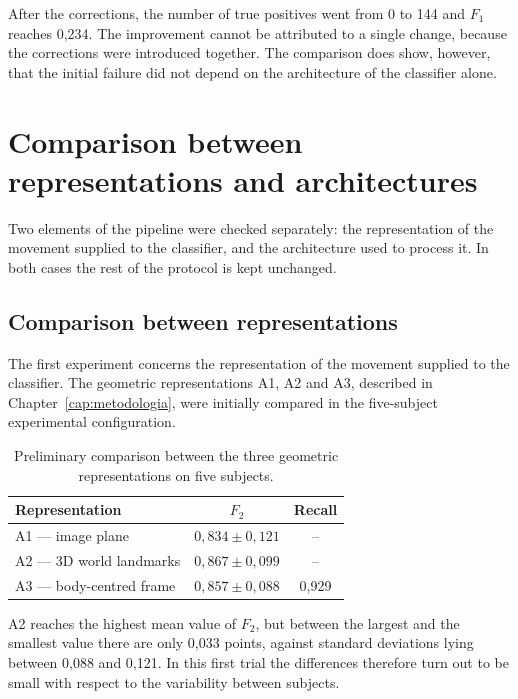 After the corrections, the number of true positives went from 0 to 144 and $F_1$ reaches 0,234. The improvement cannot be attributed to a single change, because the corrections were introduced together. The comparison does show, however, that the initial failure did not depend on the architecture of the classifier alone.

\section{Comparison between representations and architectures}
\label{sec:grandezze}

Two elements of the pipeline were checked separately: the representation of the movement supplied to the classifier, and the architecture used to process it. In both cases the rest of the protocol is kept unchanged.

\subsection{Comparison between representations}
\label{sec:featureset}

The first experiment concerns the representation of the movement supplied to the classifier. The geometric representations A1, A2 and A3, described in Chapter~\ref{cap:metodologia}, were initially compared in the five-subject experimental configuration.

\begin{table}[ht]
\centering
\caption{Preliminary comparison between the three geometric representations on five subjects.}
\label{tab:rappresentazioni5}
\begin{tabular}{lcc}
\toprule
\textbf{Representation} & \textbf{$F_2$} & \textbf{Recall} \\
\midrule
A1 --- image plane & $0{,}834 \pm 0{,}121$ & -- \\
A2 --- 3D world landmarks & $0{,}867 \pm 0{,}099$ & -- \\
A3 --- body-centred frame & $0{,}857 \pm 0{,}088$ & 0,929 \\
\bottomrule
\end{tabular}
\end{table}

A2 reaches the highest mean value of $F_2$, but between the largest and the smallest value there are only 0,033 points, against standard deviations lying between 0,088 and 0,121. In this first trial the differences therefore turn out to be small with respect to the variability between subjects.


